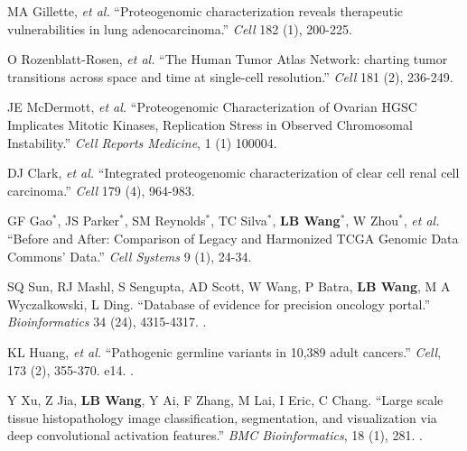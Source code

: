 \documentclass[a4paper,12pt,oneside]{article}
\begin{document}
\begin{body}
\begin{publication}[series=pub, widest*=100]
    \item
        MA Gillette, \textit{et al.}
        ``Proteogenomic characterization reveals therapeutic vulnerabilities in lung adenocarcinoma.''
        \textit{Cell} 182 (1), 200-225.

    \item
        O Rozenblatt-Rosen, \textit{et al.}
        ``The Human Tumor Atlas Network: charting tumor transitions across space and time at single-cell resolution.''
        \textit{Cell} 181 (2), 236-249.

    \item
        JE McDermott, \textit{et al.}
        ``Proteogenomic Characterization of Ovarian HGSC Implicates Mitotic Kinases, Replication Stress in Observed Chromosomal Instability.''
        \textit{Cell Reports Medicine}, 1 (1) 100004.

    \item
        DJ Clark, \textit{et al.}
        ``Integrated proteogenomic characterization of clear cell renal cell carcinoma.''
        \textit{Cell} 179 (4), 964-983.

    \item
        GF Gao$^*$, JS Parker$^*$, SM Reynolds$^*$, TC Silva$^*$, \textbf{LB Wang}$^*$, W Zhou$^*$, \textit{et al.}
        ``Before and After: Comparison of Legacy and Harmonized TCGA Genomic Data Commons’ Data.''
        \textit{Cell Systems} 9 (1), 24-34.

    \item
        SQ Sun, RJ Mashl, S Sengupta, AD Scott, W Wang, P Batra, \textbf{LB Wang}, M A Wyczalkowski, L Ding.
        ``Database of evidence for precision oncology portal.''
        \textit{Bioinformatics} 34 (24), 4315-4317.
        .

    \item
        KL Huang, \textit {et al.}
        ``Pathogenic germline variants in 10,389 adult cancers.''
        \textit{Cell}, 173 (2), 355-370. e14.
        .

    \item
        Y Xu, Z Jia, \textbf{LB Wang}, Y Ai, F Zhang, M Lai, I Eric, C Chang.
        ``Large scale tissue histopathology image classification, segmentation, and visualization via deep convolutional activation features.''
        \textit{BMC Bioinformatics}, 18 (1), 281.
        .


\end{publication}
\end{body}
\end{document}
